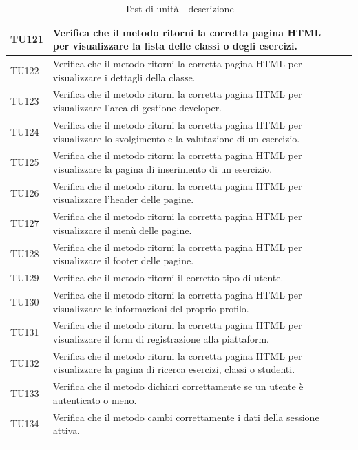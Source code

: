 \begin{longtable}{|>{\centering\arraybackslash}m{1.6cm}|>{\centering\arraybackslash}m{6.41cm}|>{\centering\arraybackslash}m{3.1cm}| c |}
		TU121 & Verifica che il metodo ritorni la corretta pagina HTML per visualizzare la lista delle classi o degli esercizi. \\ \hline
		TU122 & Verifica che il metodo ritorni la corretta pagina HTML per visualizzare i dettagli della classe. \\ \hline
		TU123 & Verifica che il metodo ritorni la corretta pagina HTML per visualizzare l'area di gestione developer. \\ \hline
		TU124 & Verifica che il metodo ritorni la corretta pagina HTML per visualizzare lo svolgimento e la valutazione di un esercizio. \\ \hline
		TU125 & Verifica che il metodo ritorni la corretta pagina HTML per visualizzare la pagina di inserimento di un esercizio. \\ \hline
		TU126 & Verifica che il metodo ritorni la corretta pagina HTML per visualizzare l'header delle pagine. \\ \hline
		TU127 & Verifica che il metodo ritorni la corretta pagina HTML per visualizzare il menù delle pagine. \\ \hline
		TU128 & Verifica che il metodo ritorni la corretta pagina HTML per visualizzare il footer delle pagine. \\ \hline
		TU129 & Verifica che il metodo ritorni il corretto tipo di utente. \\ \hline
		TU130 & Verifica che il metodo ritorni la corretta pagina HTML per visualizzare le informazioni del proprio profilo. \\ \hline
		TU131 & Verifica che il metodo ritorni la corretta pagina HTML per visualizzare il form di registrazione alla piattaform. \\ \hline
		TU132 & Verifica che il metodo ritorni la corretta pagina HTML per visualizzare la pagina di ricerca esercizi, classi o studenti. \\ \hline
		TU133 & Verifica che il metodo dichiari correttamente se un utente è autenticato o meno.  \\ \hline
		TU134 & Verifica che il metodo cambi correttamente i dati della sessione attiva.  \\ \hline
		
		\caption{Test di unità - descrizione}
\end{longtable}

